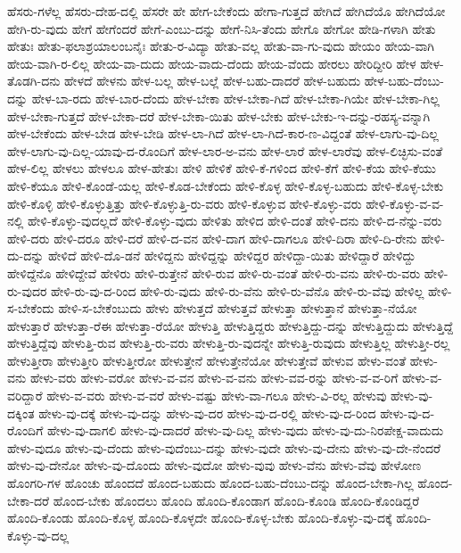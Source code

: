 {ಹೆಸರು-ಗಳೆಲ್ಲ
ಹೆಸರು-ದೇಹ-ದಲ್ಲಿ
ಹೆಸರೇ
ಹೇ
ಹೇಗ-ಬೇಕೆಂದು
ಹೇಗಾ-ಗುತ್ತದೆ
ಹೇಗಿದೆ
ಹೇಗಿದೆಯೊ
ಹೇಗಿದೆಯೋ
ಹೇಗಿ-ರು-ವುದು
ಹೇಗೆ
ಹೇಗೆಂದರೆ
ಹೇಗೆ-ಎಂಬು-ದನ್ನು
ಹೇಗೆ-ನಿಸಿ-ತೆಂದು
ಹೇಗೊ
ಹೇಗೋ
ಹೇಡಿ-ಗಳಾಗಿ
ಹೇತು
ಹೇತುಃ
ಹೇತು-ಫಲಾಶ್ರಯಾಲಂಬನೈಃ
ಹೇತು-ರ-ವಿದ್ಯಾ
ಹೇತು-ವಲ್ಲ
ಹೇತು-ವಾ-ಗು-ವುದು
ಹೇಯಂ
ಹೇಯ-ವಾಗಿ
ಹೇಯ-ವಾಗಿ-ರ-ಲಿಲ್ಲ
ಹೇಯ-ವಾ-ದುದು
ಹೇಯ-ವಾದು-ದೆಂದು
ಹೇಯ-ವೆಂದು
ಹೇರಲು
ಹೇರಿದ್ದೀರಿ
ಹೇಳ
ಹೇಳ-ತೊಡಗಿ-ದನು
ಹೇಳದೆ
ಹೇಳನು
ಹೇಳ-ಬಲ್ಲ
ಹೇಳ-ಬಲ್ಲೆ
ಹೇಳ-ಬಹು-ದಾದರೆ
ಹೇಳ-ಬಹುದು
ಹೇಳ-ಬಹು-ದೆಂಬು-ದನ್ನು
ಹೇಳ-ಬಾ-ರದು
ಹೇಳ-ಬಾರ-ದೆಂದು
ಹೇಳ-ಬೇಕಾ
ಹೇಳ-ಬೇಕಾ-ಗಿದೆ
ಹೇಳ-ಬೇಕಾ-ಗಿಯೇ
ಹೇಳ-ಬೇಕಾ-ಗಿಲ್ಲ
ಹೇಳ-ಬೇಕಾ-ಗುತ್ತದೆ
ಹೇಳ-ಬೇಕಾ-ದರೆ
ಹೇಳ-ಬೇಕಾ-ಯಿತು
ಹೇಳ-ಬೇಕು
ಹೇಳ-ಬೇಕು-ಇ-ದನ್ನು-ರಹಸ್ಯ-ವನ್ನಾಗಿ
ಹೇಳ-ಬೇಕೆಂದು
ಹೇಳ-ಬೇಡ
ಹೇಳ-ಬೇಡಿ
ಹೇಳ-ಲಾ-ಗಿದೆ
ಹೇಳ-ಲಾ-ಗಿದೆ-ಕಾರ-ಣ-ವಿದ್ದಂತೆ
ಹೇಳ-ಲಾಗು-ವು-ದಿಲ್ಲ
ಹೇಳ-ಲಾಗು-ವು-ದಿಲ್ಲ-ಯಾವು-ದ-ರೊಂದಿಗೆ
ಹೇಳ-ಲಾರ-ಅ-ವನು
ಹೇಳ-ಲಾರೆ
ಹೇಳ-ಲಾರೆವು
ಹೇಳ-ಲಿಚ್ಛಿಸು-ವಂತೆ
ಹೇಳ-ಲಿಲ್ಲ
ಹೇಳಲು
ಹೇಳಲೂ
ಹೇಳ-ಹೇತುಃ
ಹೇಳಿ
ಹೇಳಿಕೆ
ಹೇಳಿ-ಕೆ-ಗಳಿಂದ
ಹೇಳಿ-ಕೆಗೆ
ಹೇಳಿ-ಕೆಯ
ಹೇಳಿ-ಕೆಯು
ಹೇಳಿ-ಕೆಯೂ
ಹೇಳಿ-ಕೊಂಡೆ-ಯಲ್ಲ
ಹೇಳಿ-ಕೊಡ-ಬೇಕೆಂದು
ಹೇಳಿ-ಕೊಳ್ಳ
ಹೇಳಿ-ಕೊಳ್ಳ-ಬಹುದು
ಹೇಳಿ-ಕೊಳ್ಳ-ಬೇಕು
ಹೇಳಿ-ಕೊಳ್ಳಿ
ಹೇಳಿ-ಕೊಳ್ಳುತ್ತಿತ್ತು
ಹೇಳಿ-ಕೊಳ್ಳುತ್ತಿ-ರು-ವರು
ಹೇಳಿ-ಕೊಳ್ಳುವ
ಹೇಳಿ-ಕೊಳ್ಳು-ವರು
ಹೇಳಿ-ಕೊಳ್ಳು-ವ-ವ-ನಲ್ಲಿ
ಹೇಳಿ-ಕೊಳ್ಳು-ವುದಲ್ಲದೆ
ಹೇಳಿ-ಕೊಳ್ಳು-ವುದು
ಹೇಳಿತು
ಹೇಳಿದ
ಹೇಳಿ-ದಂತೆ
ಹೇಳಿ-ದನು
ಹೇಳಿ-ದ-ನೆನ್ನು-ವರು
ಹೇಳಿ-ದರು
ಹೇಳಿ-ದರೂ
ಹೇಳಿ-ದರೆ
ಹೇಳಿ-ದ-ವನ
ಹೇಳಿ-ದಾಗ
ಹೇಳಿ-ದಾಗಲೂ
ಹೇಳಿ-ದಿರಾ
ಹೇಳಿ-ದಿ-ರೇನು
ಹೇಳಿ-ದು-ದನ್ನು
ಹೇಳಿದೆ
ಹೇಳಿ-ದೊ-ಡನೆ
ಹೇಳಿದ್ದನು
ಹೇಳಿದ್ದನ್ನು
ಹೇಳಿದ್ದರ
ಹೇಳಿದ್ದಾ-ಯಿತು
ಹೇಳಿದ್ದಾರೆ
ಹೇಳಿದ್ದು
ಹೇಳಿದ್ದೆನೊ
ಹೇಳಿದ್ದೇವೆ
ಹೇಳಿರು
ಹೇಳಿ-ರುತ್ತೇನೆ
ಹೇಳಿ-ರುವ
ಹೇಳಿ-ರು-ವಂತೆ
ಹೇಳಿ-ರು-ವನು
ಹೇಳಿ-ರು-ವರು
ಹೇಳಿ-ರು-ವುದರ
ಹೇಳಿ-ರು-ವು-ದ-ರಿಂದ
ಹೇಳಿ-ರು-ವುದು
ಹೇಳಿ-ರು-ವೆನು
ಹೇಳಿ-ರು-ವೆನೊ
ಹೇಳಿ-ರು-ವೆವು
ಹೇಳಿಲ್ಲ
ಹೇಳಿ-ಸ-ಬೇಕೆಂದು
ಹೇಳಿ-ಸ-ಬೇಕೆಂಬುದು
ಹೇಳು
ಹೇಳುತ್ತದೆ
ಹೇಳುತ್ತವೆ
ಹೇಳುತ್ತಾ
ಹೇಳುತ್ತಾನೆ
ಹೇಳುತ್ತಾ-ನೆಯೋ
ಹೇಳುತ್ತಾರೆ
ಹೇಳುತ್ತಾ-ರೆಈ
ಹೇಳುತ್ತಾ-ರೆಯೋ
ಹೇಳುತ್ತಿ
ಹೇಳುತ್ತಿದ್ದರು
ಹೇಳುತ್ತಿದ್ದು-ದನ್ನು
ಹೇಳುತ್ತಿದ್ದುದು
ಹೇಳುತ್ತಿದ್ದೆ
ಹೇಳುತ್ತಿದ್ದೆವು
ಹೇಳುತ್ತಿ-ರುವ
ಹೇಳುತ್ತಿ-ರು-ವರು
ಹೇಳುತ್ತಿ-ರು-ವುದನ್ನೇ
ಹೇಳುತ್ತಿ-ರುವುದು
ಹೇಳುತ್ತಿಲ್ಲ
ಹೇಳುತ್ತೀ-ರಲ್ಲ
ಹೇಳುತ್ತೀರಾ
ಹೇಳುತ್ತೀರಿ
ಹೇಳುತ್ತೀರೋ
ಹೇಳುತ್ತೇನೆ
ಹೇಳುತ್ತೇನೆಯೋ
ಹೇಳುತ್ತೇವೆ
ಹೇಳುವ
ಹೇಳು-ವಂತೆ
ಹೇಳು-ವನು
ಹೇಳು-ವರು
ಹೇಳು-ವರೋ
ಹೇಳು-ವ-ವನ
ಹೇಳು-ವ-ವನು
ಹೇಳು-ವವ-ರನ್ನು
ಹೇಳು-ವ-ವ-ರಿಗೆ
ಹೇಳು-ವ-ವರಿದ್ದಾರೆ
ಹೇಳು-ವ-ವರು
ಹೇಳು-ವ-ವರೆ
ಹೇಳು-ವಷ್ಟು
ಹೇಳು-ವಾ-ಗಲೂ
ಹೇಳು-ವಿ-ರಲ್ಲ
ಹೇಳುವು
ಹೇಳು-ವು-ದಕ್ಕಿಂತ
ಹೇಳು-ವು-ದಕ್ಕೆ
ಹೇಳು-ವು-ದನ್ನು
ಹೇಳು-ವು-ದರ
ಹೇಳು-ವು-ದ-ರಲ್ಲಿ
ಹೇಳು-ವು-ದ-ರಿಂದ
ಹೇಳು-ವು-ದ-ರೊಂದಿಗೆ
ಹೇಳು-ವು-ದಾಗಲಿ
ಹೇಳು-ವು-ದಾದರೆ
ಹೇಳು-ವು-ದಿಲ್ಲ
ಹೇಳು-ವುದು
ಹೇಳು-ವು-ದು-ನಿರಪೇಕ್ಷ-ವಾದುದು
ಹೇಳು-ವುದೂ
ಹೇಳು-ವು-ದೆಂದು
ಹೇಳು-ವುದೆಂಬು-ದನ್ನು
ಹೇಳು-ವುದೇ
ಹೇಳು-ವು-ದೇನು
ಹೇಳು-ವು-ದೇ-ನೆಂದರೆ
ಹೇಳು-ವು-ದೇನೋ
ಹೇಳು-ವು-ದೊಂದು
ಹೇಳು-ವುದೋ
ಹೇಳು-ವುವು
ಹೇಳು-ವೆನು
ಹೇಳು-ವೆವು
ಹೇಳೋಣ
ಹೊಂಗರಿ-ಗಳ
ಹೊಂಚು
ಹೊಂದದೆ
ಹೊಂದ-ಬಹುದು
ಹೊಂದ-ಬಹು-ದೆಂಬು-ದನ್ನು
ಹೊಂದ-ಬೇಕಾ-ಗಿಲ್ಲ
ಹೊಂದ-ಬೇಕಾ-ದರೆ
ಹೊಂದ-ಬೇಕು
ಹೊಂದಲು
ಹೊಂದಿ
ಹೊಂದಿ-ಕೊಂಡಾಗ
ಹೊಂದಿ-ಕೊಂಡಿ
ಹೊಂದಿ-ಕೊಂಡಿದ್ದರೆ
ಹೊಂದಿ-ಕೊಂಡು
ಹೊಂದಿ-ಕೊಳ್ಳ
ಹೊಂದಿ-ಕೊಳ್ಳದೇ
ಹೊಂದಿ-ಕೊಳ್ಳ-ಬೇಕು
ಹೊಂದಿ-ಕೊಳ್ಳು-ವು-ದಕ್ಕೆ
ಹೊಂದಿ-ಕೊಳ್ಳು-ವು-ದಲ್ಲ
}
